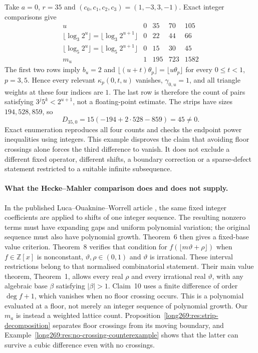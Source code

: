 \documentclass[11pt]{article}
\theoremstyle{remark}
\theoremstyle{plain}
\begin{document}
\begin{example}
\label{long269:res:no-crossing-counterexample}
Take $a=0$, $r=35$ and $(c_0,c_1,c_2,c_3)=(1,-3,3,-1)$.  Exact integer
comparisons give
\[
\begin{array}{c|rrrr}
 u&0&35&70&105\\\hline
 \lfloor\log_3 2^u\rfloor=\lfloor\log_3 2^{u+1}\rfloor&0&22&44&66\\
 \lfloor\log_5 2^u\rfloor=\lfloor\log_5 2^{u+1}\rfloor&0&15&30&45\\
 m_u&1&195&723&1582
\end{array}
\]
The first two rows imply $b_u=2$ and
$\lfloor(u+t)\theta_p\rfloor=\lfloor u\theta_p\rfloor$ for every
$0\le t<1$, $p=3,5$.  Hence every relevant $\kappa_p(0,t,u)$ vanishes,
$\gamma_{0,u}=1$, and all triangle weights at these four indices are $1$.
The last row is therefore the count of pairs satisfying
$3^j5^k<2^{u+1}$, not a floating-point estimate.  The strips have sizes
$194,528,859$, so
\[
 D_{35,0}=15(-194+2\cdot528-859)=45\ne0.
\]
Exact enumeration reproduces all four counts and
checks the endpoint power inequalities using integers.  This example disproves the claim that avoiding floor crossings alone
forces the third difference to vanish.  It does not
exclude a different fixed operator, different shifts, a boundary correction
or a sparse-defect statement restricted to a suitable infinite subsequence.
\end{example}


\paragraph{What the Hecke--Mahler comparison does and does not supply.}
In the published Luca--Ouaknine--Worrell article
\cite[Definition~5 and Theorem~6]{lucaouaknineworrell2025}, the same fixed
integer coefficients are applied to shifts of one integer sequence.
The resulting nonzero terms must have expanding gaps and uniform
polynomial variation; the original sequence must also have polynomial
growth.  Theorem~6 then gives a fixed-base value criterion.  Theorem~8 verifies that
condition for $f(\lfloor m\vartheta+\rho\rfloor)$ when
$f\in\mathbb Z[x]$ is nonconstant, $\vartheta,\rho\in(0,1)$ and
$\vartheta$ is irrational.  These interval restrictions belong to that
normalised combinatorial statement.  Their main value theorem,
Theorem~1, allows every real $\rho$ and every irrational real $\vartheta$,
with any algebraic base $\beta$ satisfying $|\beta|>1$.
Claim~10 uses a finite difference of order $\deg f+1$, which vanishes
when no floor crossing occurs.  This is a polynomial evaluated at a
floor, not merely an integer sequence of polynomial growth.
Our $m_a$ is instead a weighted lattice count.  Proposition~\ref{long269:res:strip-decomposition}
separates floor crossings from its moving boundary, and
Example~\ref{long269:res:no-crossing-counterexample} shows that the latter
can survive a cubic difference even with no crossings.
\end{document}

